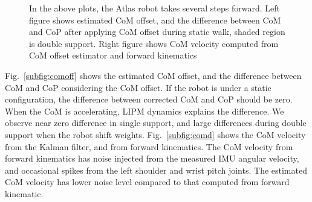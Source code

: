 \documentclass{ws-ijhr}
\begin{document}
\begin{figure}
  \begin{center}
  
  \caption{In the above plots, the Atlas robot takes several steps forward. Left figure shows estimated CoM offset, and the difference between CoM and CoP after applying CoM offset during static walk, shaded region is double support. Right figure shows CoM velocity computed from CoM offset estimator and forward kinematics} 
  \label{fig:comoff} 
  \end{center}
\end{figure}

Fig.~\ref{subfig:comoff} shows the estimated CoM offset, and the difference between CoM and CoP considering the CoM offset. If the robot is under a static configuration, the difference between corrected CoM and CoP should be zero. When the CoM is accelerating, LIPM dynamics explains the difference. We observe near zero difference in single support, and large differences during double support when the robot shift weights. Fig.~\ref{subfig:comd} shows the CoM velocity from the Kalman filter, and from forward kinematics. The CoM velocity from forward kinematics has noise injected from the measured IMU angular velocity, and occasional spikes from the left shoulder and wrist pitch joints. The estimated CoM velocity has lower noise level compared to that computed from forward kinematic.



\end{document}
